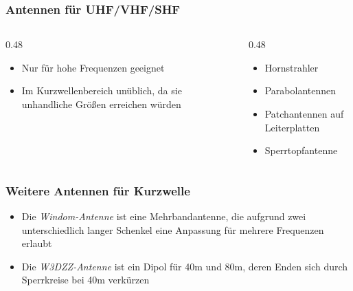 \begin{frame}
    \frametitle{Antennen für UHF/VHF/SHF}
    \begin{columns}
        \begin{column}{0.48\textwidth}
            \begin{itemize}
                \item Nur für hohe Frequenzen geeignet
                \item Im Kurzwellenbereich unüblich, da sie unhandliche Größen erreichen würden
            \end{itemize}

        \end{column}
        \begin{column}{0.48\textwidth}
            \begin{itemize}
                \item Hornstrahler
                \item Parabolantennen
                \item Patchantennen auf Leiterplatten
                \item Sperrtopfantenne
            \end{itemize}

        \end{column}
    \end{columns}

\end{frame}

\begin{frame}
    \frametitle{Weitere Antennen für Kurzwelle}
    \begin{itemize}
        \item Die \emph{Windom-Antenne} ist eine Mehrbandantenne, die aufgrund zwei unterschiedlich langer Schenkel eine Anpassung für mehrere Frequenzen erlaubt
        \item Die \emph{W3DZZ-Antenne} ist ein Dipol für 40m und 80m, deren Enden sich durch Sperrkreise bei 40m verkürzen
    \end{itemize}
\end{frame}

